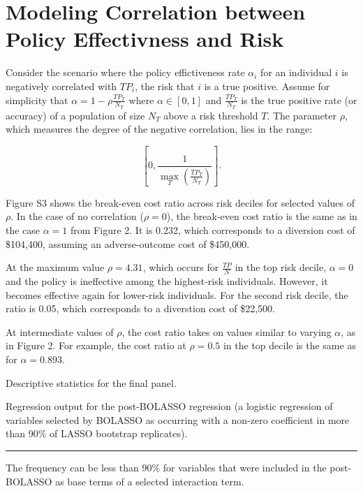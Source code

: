 \documentclass[9pt,twoside]{pnas-new}
\begin{document}
\section{Modeling Correlation between Policy Effectivness and Risk}

Consider the scenario where the policy effictiveness rate $\alpha_i$ for an individual $i$ is negatively correlated with $TP_i$, the risk that $i$ is a true positive. Assume for simplicity that $\alpha = 1 - \rho \frac{TP_T}{N_T}$ where $\alpha \in [0,1]$ and $\frac{TP_T}{N_T}$ is the true positive rate (or accuracy) of a population of size $N_T$ above a risk threshold $T$. The parameter $\rho$, which measures the degree of the negative correlation, lies in the range:

\[ \left[0, \frac{1}{\max\limits_{T} \left( \frac{TP_T}{N_T} \right)}\right]. \]

Figure S3 shows the break-even cost ratio across risk deciles for selected values of $\rho$. In the case of no correlation ($\rho=0$), the break-even cost ratio is the same as in the case $\alpha = 1$ from Figure 2. It is 0.232, which corresponds to a diversion cost of \$104,400, assuming an adverse-outcome cost of \$450,000.

At the maximum value $\rho = 4.31$, which occurs for $\frac{TP}{N}$ in the top risk decile, $\alpha = 0$ and the policy is ineffective among the highest-risk individuals. However, it becomes effective again for lower-risk individuals. For the second risk decile, the ratio is 0.05, which corresponds to a diverstion cost of \$22,500.

At intermediate values of $\rho$, the cost ratio takes on values similar to varying $\alpha$, as in Figure 2. For example, the cost ratio at $\rho=0.5$ in the top decile is the same as for $\alpha = 0.893$. 

\footnotesize

\normalsize

\begin{table}
\caption{Descriptive statistics for the final panel.}
\centering

\end{table}

\begin{table}
\caption{Regression output for the post-BOLASSO regression (a logistic regression of variables selected by BOLASSO as occurring with a non-zero coefficient in more than 90\% of LASSO bootstrap replicates).}
\centering
\small

\hrule
\begin{tablenotes}
\footnotesize
\item * The frequency can be less than 90\% for variables that were included in the post-BOLASSO as base terms of a selected interaction term.
\end{tablenotes}
\end{table}
\end{document}
